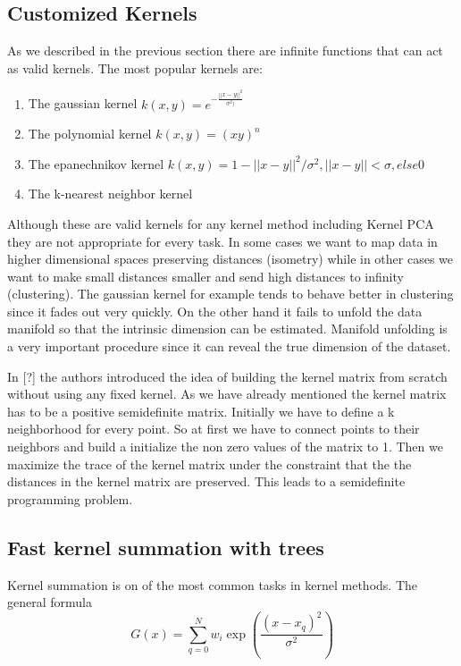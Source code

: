 \documentclass[12pt,letterpaper,doublespaced,ETD,dvips,proposal]{gtthesis}
\begin{document}
\begin{Body}
\subsection{Customized Kernels} As we described in the previous
section there are infinite functions that can act as valid kernels.
The most popular kernels are:
\begin{enumerate}
  \item The gaussian kernel $k(x, y)=e^{-\frac{||x-y||^2}{\sigma^2)}}$
  \item The polynomial kernel $k(x, y)=(xy)^n$
  \item The epanechnikov kernel $k(x, y)=1-||x-y||^2/\sigma^2, ||x-y||<\sigma, else 0$
  \item The k-nearest neighbor kernel
\end{enumerate}

Although these are valid kernels for any kernel method including
Kernel PCA they are not appropriate for every task. In some cases we
want to map data in higher dimensional spaces preserving distances
(isometry) while in other cases we want to make small distances
smaller and send high distances to infinity (clustering). The
gaussian kernel for example tends to behave better in clustering
since it fades out very quickly. On the other hand it fails to
unfold the data manifold so that the intrinsic dimension can be
estimated. Manifold unfolding is a very important procedure since it
can reveal the true dimension of the dataset.

In [?] the authors introduced the idea of building the kernel matrix
from scratch without using any fixed kernel. As we have already
mentioned the kernel matrix has to be a positive semidefinite
matrix. Initially we have to define a k neighborhood  for every
point. So at first we have to connect points to their neighbors and
build a initialize the non zero values of the matrix to 1. Then we
maximize the trace of the kernel matrix under the constraint that
the the distances in the kernel matrix are preserved. This leads to
a semidefinite programming problem.



\subsection{Fast kernel summation with trees} Kernel summation is
on of the most common tasks in kernel methods. The general formula
\begin{equation}
\label{kernel_sum}
  G(x)=\sum_{q=0}^{N} w_i\exp(\frac{(x-x_q)^2}{\sigma^2})
\end{equation}


\end{Body}
\end{document}

